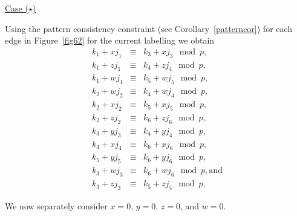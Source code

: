 
\underline{Case ($\star$)}

Using the pattern consistency constraint (see
Corollary~\ref{patterncor}) for each edge in Figure~\ref{fig62} for
the current labelling we obtain
\begin{subequations}\begin{eqnarray}
\label{ar62a}k_1+xj_1 &\equiv& k_3+xj_3 \mod p, \\
\label{ar62b}k_1+zj_1 &\equiv& k_4+zj_4 \mod p, \\
\label{ar62c}k_1+wj_1 &\equiv& k_5+wj_5 \mod p, \\
\label{ar62d}k_2+wj_2 &\equiv& k_4+wj_4 \mod p, \\
\label{ar62e}k_2+xj_2 &\equiv& k_5+xj_5 \mod p, \\
\label{ar62f}k_2+zj_2 &\equiv& k_6+zj_6 \mod p, \\
\label{ar62g}k_3+yj_3 &\equiv& k_4+yj_4 \mod p, \\
\label{ar62h}k_4+xj_4 &\equiv& k_6+xj_6 \mod p, \\
\label{ar62i}k_5+yj_5 &\equiv& k_6+yj_6 \mod p, \\
\label{ar62j}k_3+wj_3 &\equiv& k_6+wj_6 \mod p,\text{and} \\
\label{ar62k}k_3+zj_3 &\equiv& k_5+zj_5 \mod p,
\end{eqnarray}\end{subequations}



We now separately consider $x=0$, $y=0$, $z=0$, and $w=0$.

